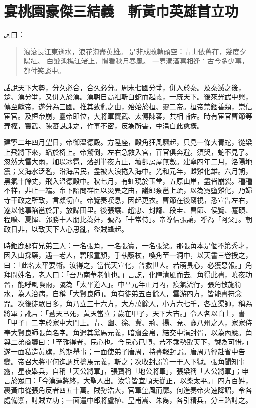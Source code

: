 
\chapter{宴桃園豪傑三結義　斬黃巾英雄首立功}

詞曰：

\begin{quote}
滾滾長江東逝水，浪花淘盡英雄。
是非成敗轉頭空：青山依舊在，幾度夕陽紅。
白髮漁樵江渚上，慣看秋月春風。
一壺濁酒喜相逢：古今多少事，都付笑談中。
\end{quote}

話說天下大勢，分久必合，合久必分。周末七國分爭，併入於秦。及秦滅之後，楚、漢分爭，又併入於漢。漢朝自高祖斬白蛇而起義，一統天下。後來光武中興，傳至獻帝，遂分為三國。推其致亂之由，殆始於桓、靈二帝。桓帝禁錮善類，崇信宦官。及桓帝崩，靈帝即位，大將軍竇武、太傅陳蕃，共相輔佐。時有宦官曹節等弄權，竇武、陳蕃謀誅之，作事不密，反為所害，中涓自此愈橫。

建寧二年四月望日，帝御溫德殿。方陞座，殿角狂風驟起，只見一條大青蛇，從梁上飛將下來，蟠於椅上。帝驚倒，左右急救入宮，百官俱奔避。須臾，蛇不見了。忽然大雷大雨，加以冰雹，落到半夜方止，壞卻房屋無數。建寧四年二月，洛陽地震；又海水泛濫，沿海居民，盡被大浪捲入海中。光和元年，雌雞化雄。六月朔，黑氣十餘丈，飛入溫德殿中。秋七月，有虹現於玉堂，五原山岸，盡皆崩裂。種種不祥，非止一端。帝下詔問群臣以災異之由，議郎蔡邕上疏，以為霓墮雞化，乃婦寺干政之所致，言頗切直。帝覽奏嘆息，因起更衣。曹節在後竊視，悉宣告左右，遂以他事陷邕於罪，放歸田里。後張讓、趙忠、封諝、段圭、曹節、侯覽、蹇碩、程曠、夏惲、郭勝十人朋比為奸，號為「十常侍」。帝尊信張讓，呼為「阿父」。朝政日非，以致天下人心思亂，盜賊蜂起。

時鉅鹿郡有兄弟三人：一名張角，一名張寶，一名張梁。那張角本是個不第秀才，因入山採藥，遇一老人，碧眼童顏，手執藜杖，喚角至一洞中，以天書三卷授之，曰：「此名太平要術。汝得之，當代天宣化，普救世人。若萌異心，必獲惡報。」角拜問姓名。老人曰：「吾乃南華老仙也。」言訖，化陣清風而去。角得此書，曉夜功習，能呼風喚雨，號為「太平道人」。中平元年正月內，疫氣流行，張角散施符水，為人治病，自稱「大賢良師」。角有徒弟五百餘人，雲游四方，皆能書符念咒。次後徒眾日多，角乃立三十六方，大方萬餘人，小方六七千，各立渠帥，稱為將軍；訛言：「蒼天已死，黃天當立；歲在甲子，天下大吉。」令人各以白土，書「甲子」二字於家中大門上。青、幽、徐、冀、荊、揚、兗、豫八州之人，家家侍奉大賢良師張角名字。角遣其黨馬元義，暗齎金帛，結交中涓封胥，以為內應。角與二弟商議曰：「至難得者，民心也。今民心已順，若不乘勢取天下，誠為可惜。」遂一面私造黃旗，約期舉事；一面使弟子唐周，持書報封諝。唐周乃徑赴省中告變。帝召大將軍何進調兵擒馬元義，斬之；次收封諝等一干人下獄。張角聞知事露，星夜舉兵，自稱「天公將軍」，張寶稱「地公將軍」，張梁稱「人公將軍」；申言於眾曰：「今漢運將終，大聖人出。汝等皆宜順天從正，以樂太平。」四方百姓，裹黃巾從張角反者四五十萬。賊勢浩大，官軍望風而靡。何進奏帝火速降詔，令各處備禦，討賊立功；一面遣中郎將盧植、皇甫嵩、朱雋，各引精兵，分三路討之。

